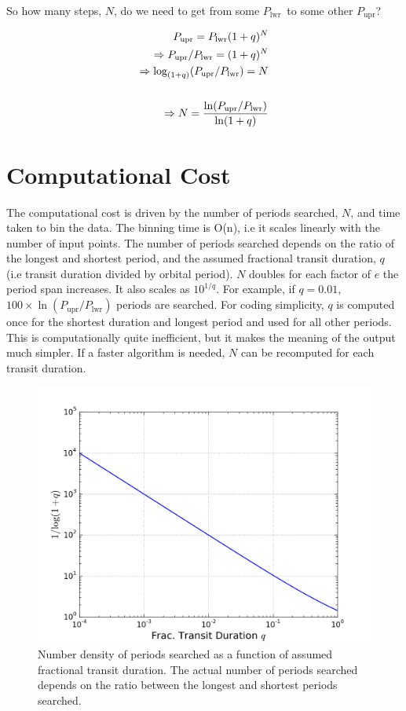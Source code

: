 \documentclass[11pt]{article}
\newcommand{\Plwr}{\ensuremath{P_{\mathrm{lwr}}}}
\newcommand{\Pupr}{\ensuremath{P_{\mathrm{upr}}}}
\begin{document}
So how many steps, $N$, do we need to get from some \Plwr\ to some other \Pupr?

\begin{eqnarray*}
\Pupr = \Plwr(1+q)^N\\
\Rightarrow \Pupr/\Plwr = (1+q)^N\\
\Rightarrow \log_{(1+q)} (\Pupr/\Plwr) = N\\
\vspace{1ex}\\
\Rightarrow N = \frac{\ln(\Pupr/\Plwr)}{ \ln(1+q)}
\end{eqnarray*}


\section{Computational Cost}
The computational cost is driven by the number of periods searched, $N$, and time taken to bin the data. The binning time is O(n), i.e it scales linearly with the number of input points. The number of periods searched depends on the ratio of the longest and shortest period, and the assumed fractional transit duration, $q$ (i.e transit duration divided by orbital period). $N$ doubles for each factor of $e$ the period span increases. It also scales as $10^{1/q}$. For example, if $q= 0.01$, $100 \times \ln(\Pupr/\Plwr)$ periods are searched. For coding simplicity, $q$ is computed once for the shortest duration and longest period and used for all other periods. This is computationally quite inefficient, but it makes the meaning of the output much simpler. If a faster algorithm is needed, $N$ can be recomputed for each transit duration.


\begin{figure}[bht]
     \begin{center}
    \includegraphics[angle=0, scale=.4]{qplot}
    \caption{Number density of periods searched as a function of assumed fractional transit duration. The actual number of periods searched depends on the ratio between the longest and shortest periods searched.}
     \end{center}
 \end{figure}
\end{document}
